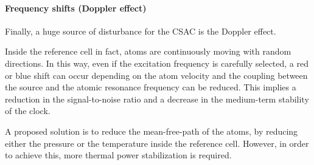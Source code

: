 \paragraph{Frequency shifts (Doppler effect)}

Finally, a huge source of disturbance for the CSAC is the Doppler effect.

Inside the reference cell in fact, atoms are continuously moving with random directions.
In this way, even if the excitation frequency is carefully selected, a red or blue shift can occur depending on the atom velocity and the coupling between the source and the atomic resonance frequency can be reduced.
This implies a reduction in the signal-to-noise ratio and a decrease in the medium-term stability of the clock.

A proposed solution is to reduce the mean-free-path of the atoms, by reducing either the pressure or the temperature inside the reference cell.
However, in order to achieve this, more thermal power stabilization is required.
